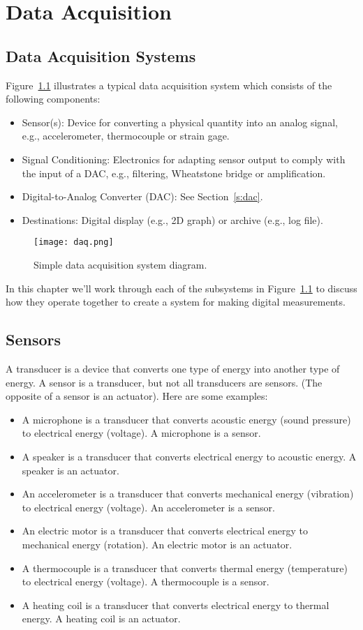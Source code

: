 \chapter{Data Acquisition}\label{c:daq}

\section{Data Acquisition Systems}
Figure~\ref{f:daq} illustrates a typical \gls{data acquisition system} which consists of the following components:
\begin{itemize}
\item Sensor(s): Device for converting a physical quantity into an analog signal, e.g., accelerometer, thermocouple or strain gage.
\item Signal Conditioning: Electronics for adapting sensor output to comply with the input of a DAC, e.g., filtering, Wheatstone bridge or amplification.
\item Digital-to-Analog Converter (DAC): See Section~\ref{s:dac}.
\item Destinations: Digital display (e.g., 2D graph) or archive (e.g., log file).
\end{itemize}

\begin{figure}[hbt!]
\centering
\texttt{[image: daq.png]}
\caption{Simple data acquisition system diagram.}
\label{f:daq}
\end{figure}

In this chapter we'll work through each of the subsystems in Figure~\ref{f:daq} to discuss how they operate together to create a system for making digital measurements.

\section{Sensors}
A \gls{transducer} is a device that converts one type of energy into another type of energy.  A sensor is a transducer, but not all transducers are sensors.  (The opposite of a sensor is an actuator).  Here are some examples:
\begin{itemize}
\item A microphone is a transducer that converts acoustic energy (sound pressure) to electrical energy (voltage). A microphone is a sensor.
\item A speaker is a transducer that converts electrical energy to acoustic energy.  A speaker is an actuator.
\item An accelerometer is a transducer that converts mechanical energy (vibration) to electrical energy (voltage).  An accelerometer is a sensor.
\item An electric motor is a transducer that converts electrical energy to mechanical energy (rotation).  An electric motor is an actuator.
\item A thermocouple is a transducer that converts thermal energy (temperature) to electrical energy (voltage).  A thermocouple is a sensor.
\item A heating coil is a transducer that converts electrical energy to thermal energy.  A heating coil is an actuator.
\end{itemize}

